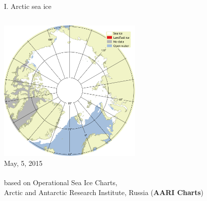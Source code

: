 \documentclass[8pt]{beamer}
\newcommand\Fontvi{\fontsize{6}{7.2}\selectfont}
\begin{document}
\setwatermark{\fontsize{125pt}{125pt}\selectfont{}}
\begin{frame}[fragile]{I. Arctic sea ice}
	\begin{columns}
		\includegraphics[height=7cm]{./img/ArcticSI_crop.pdf}\\
		May, 5, 2015\\~\\
		\Fontvi
		based on Operational Sea Ice Charts,\\
		Arctic and Antarctic Research Institute, Russia (\textbf{AARI Charts})
	\end{columns}
	
\end{frame}
\end{document}
